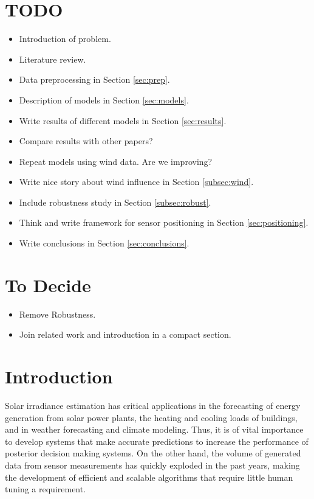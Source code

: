 \documentclass[preprints,article,accept,moreauthors,pdftex]{template/mdpi}
\begin{document}

\section{TODO}
\begin{itemize}
    \item Introduction of problem.
    \item Literature review.
    \item Data preprocessing in Section \ref{sec:prep}.
    \item Description of models in Section \ref{sec:models}.
    \item Write results of different models in Section \ref{sec:results}.
    \item Compare results with other papers?
    \item Repeat models using wind data. Are we improving?
    \item Write nice story about wind influence in Section \ref{subsec:wind}.
    \item Include robustness study in Section \ref{subsec:robust}.
    \item Think and write framework for sensor positioning in Section \ref{sec:positioning}.
    \item Write conclusions in Section \ref{sec:conclusions}.

\end{itemize}

\section{To Decide}
\begin{itemize}
    \item Remove Robustness.
    \item Join related work and introduction in a compact section.

\end{itemize}
\section{Introduction}\label{sec:intro}

Solar irradiance estimation has critical applications in the forecasting of energy generation from solar power plants, the heating and cooling loads of buildings, and in weather forecasting and climate modeling. Thus, it is of vital importance to develop systems that make accurate predictions to increase the performance of posterior decision making systems. On the other hand, the volume of generated data from sensor measurements has quickly exploded in the past years, making the development of efficient and scalable algorithms that require little human tuning a requirement.
\end{document}
